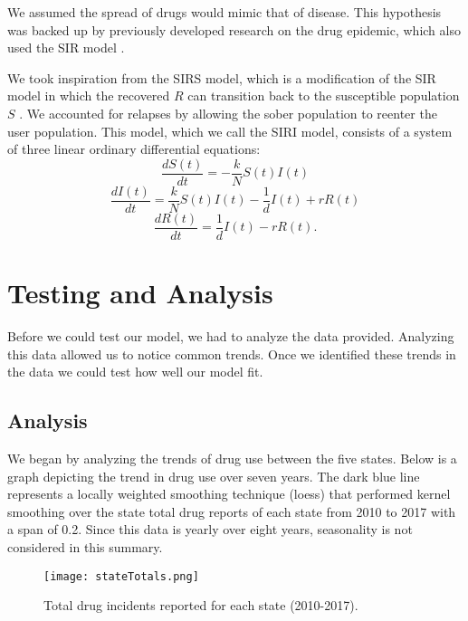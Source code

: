 \documentclass[12pt, letterpaper]{article}
\begin{document}
We assumed the spread of drugs would mimic that of disease. This hypothesis was backed up by previously developed research on the drug epidemic, which also used the SIR model \citep{optimalcontrol}\citep{optimaltiming}. 

We took inspiration from the SIRS model, which is a modification of the SIR model in which the recovered $R$ can transition back to the susceptible population $S$ \citep{SIRS}. We accounted for relapses by allowing the sober population to reenter the user population. This model, which we call the SIRI model, consists of a system of three linear ordinary differential equations:
    \begin{equation}
        \frac{dS(t)}{dt} = -\frac{k}{N}S(t)I(t)
    \end{equation}
    \begin{equation}
        \frac{dI(t)}{dt} = \frac{k}{N}S(t)I(t) - \frac{1}{d}I(t) + rR(t)
    \end{equation}
    \begin{equation}
        \frac{dR(t)}{dt} = \frac{1}{d}I(t) - rR(t).
    \end{equation}


\section{Testing and Analysis}
Before we could test our model, we had to analyze the data provided. Analyzing this data allowed us to notice common trends. Once we identified these trends in the data we could test how well our model fit. 

\subsection{Analysis}
We began by analyzing the trends of drug use between the five states. Below is a graph depicting the trend in drug use over seven years. The dark blue line represents a locally weighted smoothing technique (loess) that performed kernel smoothing over the state total drug reports of each state from 2010 to 2017 with a span of 0.2. Since this data is yearly over eight years, seasonality is not considered in this summary.

    \begin{figure}[H]
    \centering
    \texttt{[image: stateTotals.png]}
    \caption{Total drug incidents reported for each state (2010-2017).}
    \label{fig:stateTotals}
    \end{figure}
\end{document}
